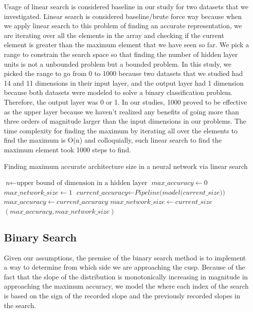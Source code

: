 \documentclass[conference]{IEEEtran}
\begin{document}
Usage of linear search is considered baseline in our study for two datasets that we investigated. Linear search is considered baseline/brute force way because when we apply linear search to this problem of finding an accurate representation, we are iterating over all the elements in the array and checking if the current element is greater than the maximum element that we have seen so far. We pick a range to constrain the search space so that finding the number of hidden layer units is not a unbounded problem but a bounded problem. In this study, we picked the range to go from 0 to 1000 because two datasets that we studied had 14 and 11 dimensions in their input layer, and the output layer had 1 dimension because both datasets were modeled to solve a binary classification problem. Therefore, the output layer was 0 or 1. In our studies, 1000 proved to be effective as the upper layer because we haven't realized any benefits of going more than three orders of magnitude larger than the input dimensions in our problems. The time complexity for finding the maximum by iterating all over the elements to find the maximum is O(n) and colloquially, such linear search to find the maximum element took 1000 steps to find.  

\begin{algorithm}[H]
\caption{Finding maximum accurate architecture size in a neural network via linear search}
\begin{algorithmic}[1]
\STATE $\textit{n} \gets \text{upper bound of dimension in a hidden layer}$
\STATE $\textit{max\_accuracy} \gets 0$
\STATE $\textit{max\_network\_size} \gets 1$
\STATE $\textit{current\_accuracy} \gets \textit{Pipeline(model(current\_size))}$
\STATE $max\_accuracy \gets current\_accuracy$
\STATE $max\_network\_size \gets current\_size$
\ENDIF
\ENDFOR
\RETURN $(max\_accuracy, max\_network\_size)$
\end{algorithmic}
\end{algorithm}



\subsection{Binary Search} \label{binarysearch}

Given our assumptions, the premise of the binary search method is to implement a way to determine from which side we are approaching the cusp. Because of the fact that the slope of the distribution is monotonically increasing in magnitude in approaching the maximum accuracy, we model the where each index of the search is based on the sign of the recorded slope and the previously recorded slopes in the search. 
\end{document}
